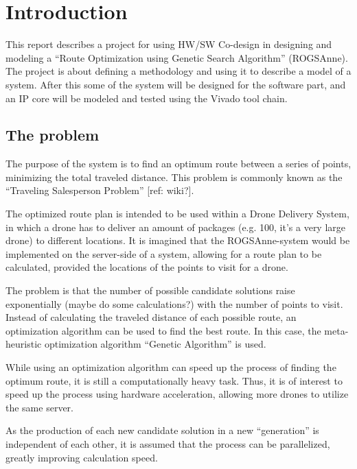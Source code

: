 
\chapter{Introduction}
This report describes a project for using HW/SW Co-design in designing and modeling a “Route Optimization using Genetic Search Algorithm” (ROGSAnne).
The project is about defining a methodology and using it to describe a model of a system. After this some of the system will be designed for the software part, and an IP core will be modeled and tested using the Vivado tool chain.

\section{The problem}
The purpose of the system is to find an optimum route between a series of points, minimizing the total traveled distance. This problem is commonly known as the “Traveling Salesperson Problem” [ref: wiki?].

The optimized route plan is intended to be used within a Drone Delivery System, in which a drone has to deliver an amount of packages (e.g. 100, it’s a very large drone) to different locations. It is imagined that the ROGSAnne-system would be implemented on the server-side of a system, allowing for a route plan to be calculated, provided the locations of the points to visit for a drone.

The problem is that the number of possible candidate solutions raise exponentially (maybe do some calculations?) with the number of points to visit. Instead of calculating the traveled distance of each possible route, an optimization algorithm can be used to find the best route. In this case, the meta-heuristic optimization algorithm “Genetic Algorithm” is used.

While using an optimization algorithm can speed up the process of finding the optimum route, it is still a computationally heavy task. Thus, it is of interest to speed up the process using hardware acceleration, allowing more drones to utilize the same server.

As the production of each new candidate solution in a new “generation” is independent of each other, it is assumed that the process can be parallelized, greatly improving calculation speed.

